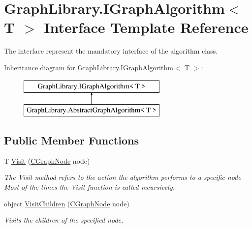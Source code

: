 \hypertarget{interface_graph_library_1_1_i_graph_algorithm}{}\section{Graph\+Library.\+I\+Graph\+Algorithm$<$ T $>$ Interface Template Reference}
\label{interface_graph_library_1_1_i_graph_algorithm}


The interface represent the mandatory interface of the algorithm class.  


Inheritance diagram for Graph\+Library.\+I\+Graph\+Algorithm$<$ T $>$\+:\begin{figure}[H]
\begin{center}
\leavevmode
\includegraphics[height=2.000000cm]{interface_graph_library_1_1_i_graph_algorithm}
\end{center}
\end{figure}
\subsection*{Public Member Functions}
\begin{DoxyCompactItemize}
\item 
T \hyperlink{interface_graph_library_1_1_i_graph_algorithm_a85b88995ba27d084e9f7dd624a98cf2a}{Visit} (\hyperlink{class_graph_library_1_1_c_graph_node}{C\+Graph\+Node} node)
\begin{DoxyCompactList}\small\item\em The Visit method refers to the action the algorithm performs to a specific node Most of the times the Visit function is called recursively. \end{DoxyCompactList}\item 
object \hyperlink{interface_graph_library_1_1_i_graph_algorithm_a17229ddd74c8e05afafa0ba7d5c1f774}{Visit\+Children} (\hyperlink{class_graph_library_1_1_c_graph_node}{C\+Graph\+Node} node)
\begin{DoxyCompactList}\small\item\em Visits the children of the specified node. \end{DoxyCompactList}\end{DoxyCompactItemize}



